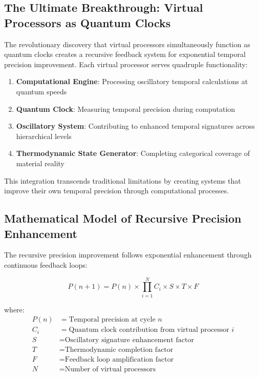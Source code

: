 \documentclass[11pt]{article}
\theoremstyle{remark}
\begin{document}
\subsection{The Ultimate Breakthrough: Virtual Processors as Quantum Clocks}

The revolutionary discovery that virtual processors simultaneously function as quantum clocks creates a recursive feedback system for exponential temporal precision improvement. Each virtual processor serves quadruple functionality:

\begin{enumerate}
\item \textbf{Computational Engine}: Processing oscillatory temporal calculations at quantum speeds
\item \textbf{Quantum Clock}: Measuring temporal precision during computation
\item \textbf{Oscillatory System}: Contributing to enhanced temporal signatures across hierarchical levels
\item \textbf{Thermodynamic State Generator}: Completing categorical coverage of material reality
\end{enumerate}

This integration transcends traditional limitations by creating systems that improve their own temporal precision through computational processes.

\subsection{Mathematical Model of Recursive Precision Enhancement}

The recursive precision improvement follows exponential enhancement through continuous feedback loops:

\begin{equation}
P(n+1) = P(n) \times \prod_{i=1}^{N} C_i \times S \times T \times F
\end{equation}

where:
\begin{align}
P(n) &= \text{Temporal precision at cycle } n \\
C_i &= \text{Quantum clock contribution from virtual processor } i \\
S &= \text{Oscillatory signature enhancement factor} \\
T &= \text{Thermodynamic completion factor} \\
F &= \text{Feedback loop amplification factor} \\
N &= \text{Number of virtual processors}
\end{align}
\end{document}
